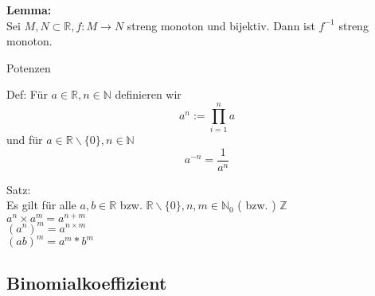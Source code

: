 \documentclass[smallheadings,headsepline,12pt,a4paper]{scrartcl}
\begin{document}
\item \textbf{ Lemma:} \\
Sei $ M,N \subset \mathbb{R} , f: M \rightarrow N $ streng monoton und bijektiv. Dann ist $f^{-1}$ streng monoton.

\begin{center}
\item[Potenzen]
\end{center}
\item Def: Für $a \in \mathbb{R} , n \in \mathbb{N} $ definieren wir \\
$$ a^n:= \prod\limits_{i=1}^n a $$
und für $ a \in \mathbb{R} \backslash \{ 0 \}, n \in \mathbb{N} $ \\
$$ a^{-n} = \frac{1}{a^n} $$
\item Satz: \\
Es gilt für alle $a,b \in \mathbb{R}$ bzw. $ \mathbb{R} \backslash \{ 0 \} , n,m \in \mathbb{N}_{0} $ ( bzw. ) $\mathbb{Z}$\\
$a^n \times a^m = a^{n+m} $\\
$(a^n)^m = a^{n\times m} $ \\
$ (ab)^m = a^m * b^m $ 



\subsection*{Binomialkoeffizient}
\end{document}
